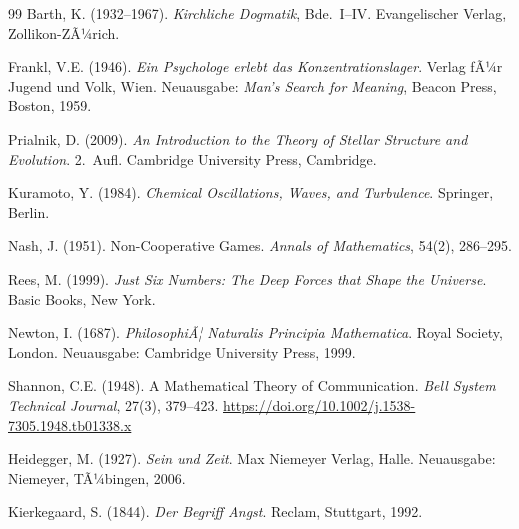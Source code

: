 ﻿\documentclass[a4paper,12pt]{article}
\theoremstyle{definition}
\begin{document}
\begin{thebibliography}{99}
Barth, K. (1932--1967). \textit{Kirchliche Dogmatik}, Bde.~I--IV. Evangelischer Verlag, Zollikon-ZÃ¼rich.

Frankl, V.E. (1946). \textit{Ein Psychologe erlebt das Konzentrationslager}. Verlag fÃ¼r Jugend und Volk, Wien. Neuausgabe: \textit{Man's Search for Meaning}, Beacon Press, Boston, 1959.

Prialnik, D. (2009). \textit{An Introduction to the Theory of Stellar Structure and Evolution}. 2.~Aufl. Cambridge University Press, Cambridge.

Kuramoto, Y. (1984). \textit{Chemical Oscillations, Waves, and Turbulence}. Springer, Berlin.

Nash, J. (1951). Non-Cooperative Games. \textit{Annals of Mathematics}, 54(2), 286--295.

Rees, M. (1999). \textit{Just Six Numbers: The Deep Forces that Shape the Universe}. Basic Books, New York.

Newton, I. (1687). \textit{PhilosophiÃ¦ Naturalis Principia Mathematica}. Royal Society, London. Neuausgabe: Cambridge University Press, 1999.

Shannon, C.E. (1948). A Mathematical Theory of Communication. \textit{Bell System Technical Journal}, 27(3), 379--423. \url{https://doi.org/10.1002/j.1538-7305.1948.tb01338.x}

Heidegger, M. (1927). \textit{Sein und Zeit}. Max Niemeyer Verlag, Halle. Neuausgabe: Niemeyer, TÃ¼bingen, 2006.

Kierkegaard, S. (1844). \textit{Der Begriff Angst}. Reclam, Stuttgart, 1992.

\end{thebibliography}
\end{document}
